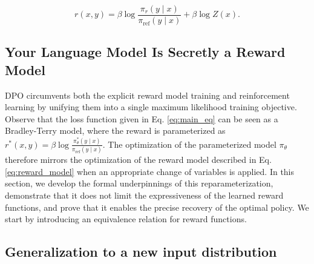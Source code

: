 \begin{equation}\label{eq:main_eq}
    r(x,y) =\beta \log \frac{\pi_r(y\mid x)}{\pi_\text{ref}(y\mid x)} + \beta \log Z(x).
\end{equation}

\subsection{Your Language Model Is Secretly a Reward Model} DPO circumvents both the explicit reward model training and reinforcement learning by unifying them into a single maximum likelihood training objective. Observe that the loss function given in Eq. \ref{eq:main_eq} can be seen as a Bradley-Terry model, where the reward is parameterized as $r^*(x, y) = \beta \log\frac{\pi^*_\theta(y \mid x)}{\pi_\text{ref}(y \mid x)}$. The optimization of the parameterized model $\pi_{\theta}$ therefore mirrors the optimization of the reward model described in Eq. \ref{eq:reward_model} when an appropriate change of variables is applied. In this section, we develop the formal underpinnings of this reparameterization, demonstrate that it does not limit the expressiveness of the learned reward functions, and prove that it enables the precise recovery of the optimal policy. We start by introducing an equivalence relation for reward functions.

\subsection{Generalization to a new input distribution}

